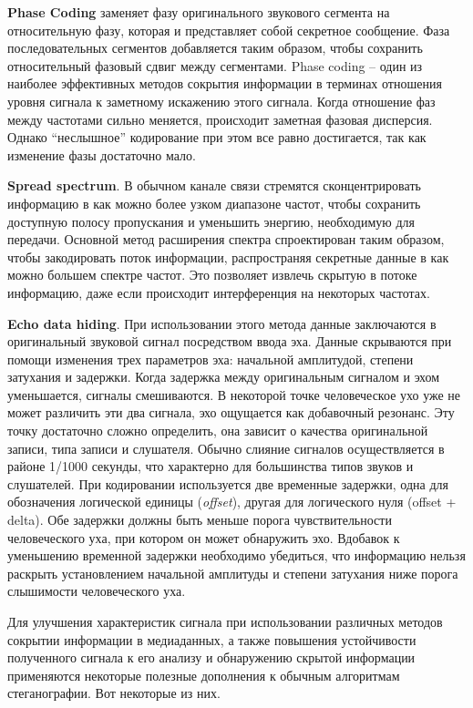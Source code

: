 \textbf{Phase Coding} заменяет фазу оригинального звукового сегмента на
относительную фазу, которая и представляет собой секретное сообщение. Фаза
последовательных сегментов добавляется таким образом, чтобы сохранить
относительный фазовый сдвиг между сегментами. Phase coding – один из наиболее
эффективных методов сокрытия информации  в терминах отношения уровня сигнала
к заметному искажению этого сигнала. Когда отношение фаз между частотами
сильно меняется, происходит заметная фазовая дисперсия. Однако “неслышное”
кодирование при этом все равно достигается, так как изменение фазы достаточно
мало.

\textbf{Spread spectrum}. В обычном канале связи стремятся сконцентрировать
информацию в как можно более узком диапазоне частот, чтобы сохранить
доступную полосу пропускания и уменьшить энергию, необходимую для передачи.
Основной метод расширения спектра спроектирован таким образом, чтобы
закодировать поток информации, распространяя секретные данные в как можно
большем спектре частот. Это позволяет извлечь скрытую в потоке информацию,
даже если происходит интерференция на некоторых частотах.

\textbf{Echo data hiding}. При использовании этого метода данные заключаются
в оригинальный звуковой сигнал посредством ввода эха. Данные скрываются при
помощи изменения трех параметров эха: начальной амплитудой, степени затухания
и задержки.  Когда задержка между оригинальным сигналом и эхом уменьшается,
сигналы смешиваются. В некоторой точке человеческое ухо уже не может
различить эти два сигнала, эхо ощущается как добавочный резонанс. Эту точку
достаточно сложно определить, она зависит о качества оригинальной записи,
типа записи и слушателя. Обычно слияние сигналов осуществляется в районе
1/1000 секунды, что характерно для большинства типов звуков и слушателей. При
кодировании используется две временные задержки, одна для обозначения
логической единицы (\emph{offset}), другая для логического нуля (offset +
delta). Обе задержки должны быть меньше порога чувствительности человеческого
уха, при котором он может обнаружить эхо. Вдобавок к уменьшению временной
задержки необходимо убедиться, что информацию нельзя раскрыть установлением
начальной амплитуды и степени затухания ниже порога слышимости человеческого
уха.

Для улучшения характеристик сигнала при использовании различных методов
сокрытии информации в медиаданных, а также повышения устойчивости полученного
сигнала к его анализу и обнаружению скрытой информации применяются некоторые
полезные дополнения к обычным алгоритмам стеганографии. Вот некоторые из них.

